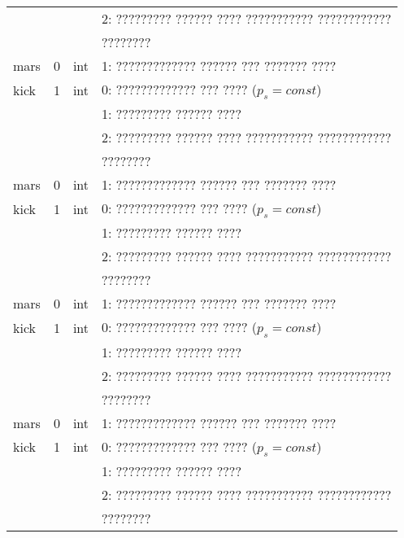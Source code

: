 \begin{longtable}[c]{|l|c|l|l|}
             &        &     & 2: ????????? ?????? ???? ??????????? ???????????? \\
             &        &     & ????????                                          \\
    mars     & 0      & int & 1: ????????????? ?????? ??? ??????? ????          \\
    kick     & 1      & int & 0: ????????????? ??? ???? (\(p_s = const\))       \\
             &        &     & 1: ????????? ?????? ????                          \\
             &        &     & 2: ????????? ?????? ???? ??????????? ???????????? \\
             &        &     & ????????                                          \\
    mars     & 0      & int & 1: ????????????? ?????? ??? ??????? ????          \\
    kick     & 1      & int & 0: ????????????? ??? ???? (\(p_s = const\))       \\
             &        &     & 1: ????????? ?????? ????                          \\
             &        &     & 2: ????????? ?????? ???? ??????????? ???????????? \\
             &        &     & ????????                                          \\
    mars     & 0      & int & 1: ????????????? ?????? ??? ??????? ????          \\
    kick     & 1      & int & 0: ????????????? ??? ???? (\(p_s = const\))       \\
             &        &     & 1: ????????? ?????? ????                          \\
             &        &     & 2: ????????? ?????? ???? ??????????? ???????????? \\
             &        &     & ????????                                          \\
    mars     & 0      & int & 1: ????????????? ?????? ??? ??????? ????          \\
    kick     & 1      & int & 0: ????????????? ??? ???? (\(p_s = const\))       \\
             &        &     & 1: ????????? ?????? ????                          \\
             &        &     & 2: ????????? ?????? ???? ??????????? ???????????? \\
             &        &     & ????????                                          \\

\end{longtable}
